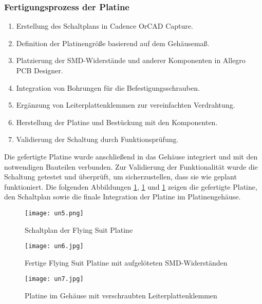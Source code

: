 \subsubsection{Fertigungsprozess der Platine}
\begin{enumerate}
    \item Erstellung des Schaltplans in Cadence OrCAD Capture.
    \item Definition der Platinengröße basierend auf dem Gehäusemaß.
    \item Platzierung der SMD-Widerstände und anderer Komponenten in Allegro PCB Designer.
    \item Integration von Bohrungen für die Befestigungsschrauben.
    \item Ergänzung von Leiterplattenklemmen zur vereinfachten Verdrahtung.
    \item Herstellung der Platine und Bestückung mit den Komponenten.
    \item Validierung der Schaltung durch Funktionsprüfung.
\end{enumerate}
Die gefertigte Platine wurde anschließend in das Gehäuse integriert und mit den notwendigen Bauteilen verbunden. Zur Validierung der Funktionalität wurde die Schaltung getestet und überprüft, um sicherzustellen, dass sie wie geplant funktioniert.
Die folgenden Abbildungen \ref{fig:un5}, \ref{fig:un5} und \ref{fig:un5} zeigen die gefertigte Platine, den Schaltplan sowie die finale Integration der Platine im Platinengehäuse.
\begin{figure}[htbp]
    \begin{center}
        \texttt{[image: un5.png]}
        \caption[Schaltplan der Flying Suit Platine (Abbildungsverzeichnis)]{Schaltplan der Flying Suit Platine}
        \label{fig:un5}
    \end{center}
\end{figure}

\begin{figure}[htbp]
    \centering
    \begin{minipage}{0.48\textwidth}
        \centering
        \texttt{[image: un6.jpg]}
        \caption[Fertige Flying Suit Platine mit aufgelöteten SMD-Widerständen (Abbildungsverzeichnis)]{Fertige Flying Suit Platine mit aufgelöteten SMD-Widerständen}
        \label{fig:un6}
    \end{minipage}
    \hfill
    \begin{minipage}{0.48\textwidth}
        \centering
        \texttt{[image: un7.jpg]}
        \caption[Platine im Gehäuse mit verschraubten Leiterplattenklemmen (Abbildungsverzeichnis)]{Platine im Gehäuse mit verschraubten Leiterplattenklemmen}
        \label{fig:un7}
    \end{minipage}
\end{figure}



